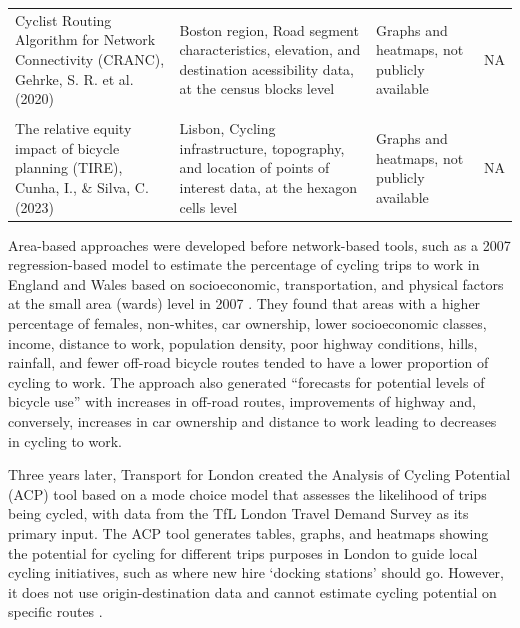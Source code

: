 \documentclass[
  super,
  preprint,
  3p]{elsarticle}
\begin{document}
\begin{longtable}[t]{>{\raggedright\arraybackslash}p{13em}>{\raggedright\arraybackslash}p{15em}>{\raggedright\arraybackslash}p{12em}>{\raggedright\arraybackslash}p{5em}}
Cyclist Routing Algorithm for Network Connectivity (CRANC), Gehrke, S. R. et al. (2020) & Boston region, Road segment characteristics, elevation, and destination acessibility data, at the census blocks level & Graphs and heatmaps, not publicly available & NA\\
\cellcolor{gray!10}{The Gross Potential for Cycling tool (CPC), Silva, C. et al. (2021 and 2022) and Lopez et al. (2021)} & \cellcolor{gray!10}{21 Portuguese cities, Land use and socio-demographic data, at the small area (census tract) level} & \cellcolor{gray!10}{Static maps showing cycling potential in different areas} & \cellcolor{gray!10}{NA}\\
The relative equity impact of bicycle planning (TIRE), Cunha, I., \& Silva, C. (2023) & Lisbon, Cycling infrastructure, topog­raphy, and location of points of interest data, at the hexagon cells level & Graphs and heatmaps, not publicly available & NA\\
\bottomrule

\end{longtable}

Area-based approaches were developed before network-based tools, such as
a 2007 regression-based model to estimate the percentage of cycling
trips to work in England and Wales based on socioeconomic,
transportation, and physical factors at the small area (wards) level in
2007 \citep{parkin_estimation_2007}. They found that areas with a higher
percentage of females, non-whites, car ownership, lower socioeconomic
classes, income, distance to work, population density, poor highway
conditions, hills, rainfall, and fewer off-road bicycle routes tended to
have a lower proportion of cycling to work. The approach also generated
``forecasts for potential levels of bicycle use'' with increases in
off-road routes, improvements of highway and, conversely, increases in
car ownership and distance to work leading to decreases in cycling to
work.

Three years later, Transport for London created the Analysis of Cycling
Potential (ACP) tool based on a mode choice model that assesses the
likelihood of trips being cycled, with data from the TfL London Travel
Demand Survey as its primary input. The ACP tool generates tables,
graphs, and heatmaps showing the potential for cycling for different
trips purposes in London to guide local cycling initiatives, such as
where new hire `docking stations' should go. However, it does not use
origin-destination data and cannot estimate cycling potential on
specific routes \citep{transport_for_london_analysis_2010}.
\end{document}
